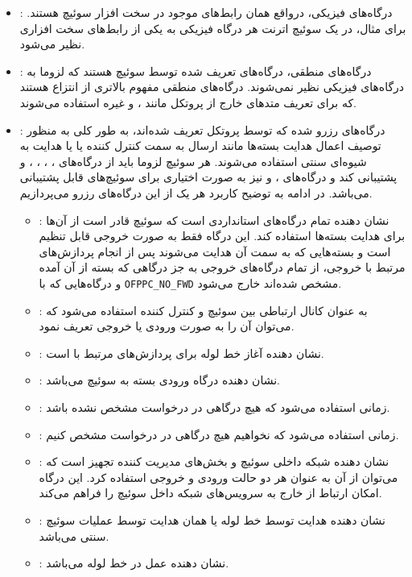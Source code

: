 \begin{itemize}
	\item
{}:
درگاه‌های فیزیکی، درواقع همان رابط‌های موجود در سخت افزار سوئیچ هستند. برای مثال، در یک سوئیچ اترنت هر درگاه فیزیکی به یکی از رابط‌های سخت افزاری نظیر می‌شود.
	\item
{}:
درگاه‌های منطقی، درگاه‌های تعریف شده توسط سوئیچ هستند که لزوما به درگاه‌های فیزیکی نظیر نمی‌شوند. درگاه‌های منطقی مفهوم بالاتری از انتزاع هستند که برای تعریف متد‌های خارج از پروتکل  مانند ،  و غیره استفاده می‌شوند.
	\item
{}:
درگاه‌های رزرو شده که توسط پروتکل تعریف شده‌اند، به طور کلی به منظور توصیف اعمال هدایت بسته‌ها مانند ارسال به سمت کنترل کننده یا  یا هدایت به شیوه‌ای سنتی  استفاده می‌شوند. هر سوئیچ  لزوما باید از درگاه‌های ، ، ، ،  و  پشتیبانی کند و درگاه‌های ،  و  نیز به صورت اختیاری برای سوئیچ‌های  قابل پشتیبانی می‌باشد. در ادامه به توضیح کاربرد هر یک از این درگاه‌های رزرو می‌پردازیم.
\begin{itemize}
	\item {}:
نشان دهنده تمام درگاه‌های استانداردی است که سوئیچ قادر است از آن‌ها برای هدایت بسته‌ها استفاده کند. این درگاه فقط به صورت خروجی قابل تنظیم است و بسته‌هایی که به سمت آن هدایت می‌شوند پس از انجام پردازش‌های مرتبط با خروجی، از تمام درگاه‌های خروجی به جز درگاهی که بسته از آن آمده و درگاه‌هایی که با \texttt{OFPPC\_NO\_FWD} مشخص شده‌اند خارج می‌شود.
	\item {}:
به عنوان کانال ارتباطی بین سوئیچ و کنترل کننده استفاده می‌شود که می‌توان آن را به صورت ورودی یا خروجی تعریف نمود.
	\item {}:
نشان دهنده آغاز خط لوله برای پردازش‌های مرتبط با  است.
	\item {}:
نشان دهنده درگاه ورودی بسته به سوئیچ می‌باشد.
	\item {}:
زمانی استفاده می‌شود که هیچ درگاهی در درخواست  مشخص نشده باشد.
	\item {}:
زمانی استفاده می‌شود که نخواهیم هیچ درگاهی در درخواست  مشخص کنیم.
	\item {}:
نشان دهنده شبکه داخلی سوئیچ و بخش‌های مدیریت کننده تجهیز است که می‌توان از آن به عنوان هر دو حالت ورودی و خروجی استفاده کرد. این درگاه امکان ارتباط از خارج به سرویس‌های شبکه داخل سوئیچ  را فراهم می‌کند.
	\item {}:
نشان دهنده هدایت توسط خط لوله  یا همان هدایت توسط عملیات سوئیچ سنتی می‌باشد.
	\item {}:
نشان دهنده عمل  در خط لوله  می‌باشد.
\end{itemize}
\end{itemize}

